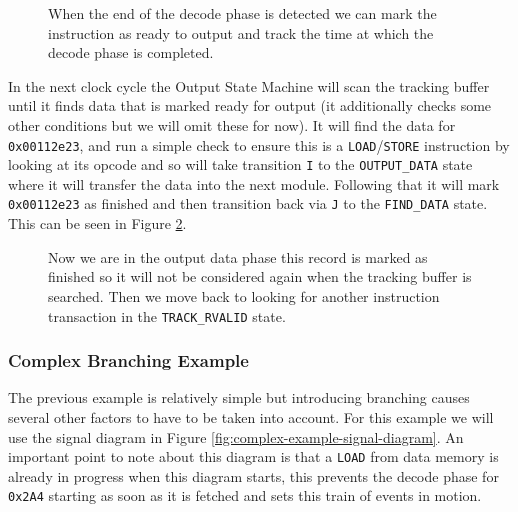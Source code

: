 \begin{figure}[htbp]
	
	\caption{When the end of the decode phase is detected we can mark the instruction as ready to output and track the time at which the decode phase is completed.}
	\label{fig:load-example-step-3}
\end{figure}

In the next clock cycle the Output State Machine will scan the tracking buffer until it finds data that is marked ready for output (it additionally checks some other conditions but we will omit these for now). It will find the data for \texttt{0x00112e23}, and run a simple check to ensure this is a \texttt{LOAD}/\texttt{STORE} instruction by looking at its opcode and so will take transition \texttt{I} to the \texttt{OUTPUT\_DATA} state where it will transfer the data into the next module. Following that it will mark \texttt{0x00112e23} as finished and then transition back via \texttt{J} to the \texttt{FIND\_DATA} state. This can be seen in Figure \ref{fig:load-example-step-4}.

\begin{figure}[htbp]
	\begin{subfigure}{\linewidth}
		
	\end{subfigure}
	\begin{subfigure}{\linewidth}
		
	\end{subfigure}
	\caption{Now we are in the output data phase this record is marked as finished so it will not be considered again when the tracking buffer is searched. Then we move back to looking for another instruction transaction in the \texttt{TRACK\_RVALID} state.}
	\label{fig:load-example-step-4}
\end{figure}

\subsubsection{Complex Branching Example}

The previous example is relatively simple but introducing branching causes several other factors to have to be taken into account. For this example we will use the signal diagram in Figure \ref{fig:complex-example-signal-diagram}. An important point to note about this diagram is that a \texttt{LOAD} from data memory is already in progress when this diagram starts, this prevents the decode phase for \texttt{0x2A4} starting as soon as it is fetched and sets this train of events in motion.

